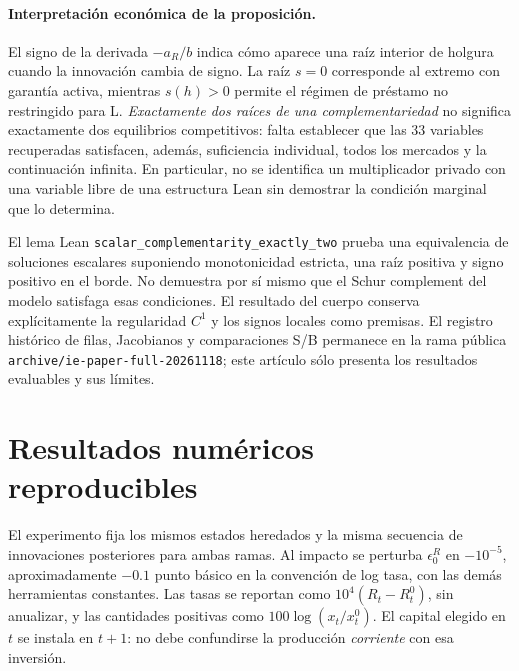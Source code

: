 
\paragraph{Interpretación económica de la proposición.}
El signo de la derivada \(-a_R/b\) indica cómo aparece una
raíz interior de holgura cuando la innovación cambia de signo.
La raíz \(s=0\) corresponde al extremo con garantía activa,
mientras \(s(h)>0\) permite el régimen de préstamo no restringido
para L. \emph{Exactamente dos raíces de una complementariedad}
no significa exactamente dos equilibrios competitivos: falta
establecer que las 33 variables recuperadas satisfacen, además,
suficiencia individual, todos los mercados y la continuación infinita.
En particular, no se identifica un multiplicador privado con una
variable libre de una estructura Lean sin demostrar la condición
marginal que lo determina.

El lema Lean \texttt{scalar\_complementarity\_exactly\_two} prueba
una equivalencia de soluciones escalares suponiendo monotonicidad
estricta, una raíz positiva y signo positivo en el borde.
No demuestra por sí mismo que el Schur complement del modelo
satisfaga esas condiciones. El resultado del cuerpo conserva
explícitamente la regularidad \(C^1\) y los signos locales como
premisas. El registro histórico de filas, Jacobianos y comparaciones S/B
permanece en la rama pública
\texttt{archive/ie-paper-full-20261118}; este artículo
sólo presenta los resultados evaluables y sus límites.

\section{Resultados numéricos reproducibles}\label{sec:compact_irf}
El experimento fija los mismos estados heredados y la misma
secuencia de innovaciones posteriores para ambas ramas.
Al impacto se perturba \(\epsilon_0^R\) en
\(-10^{-5}\), aproximadamente \(-0.1\) punto básico en la
convención de log tasa, con las demás herramientas constantes.
Las tasas se reportan como \(10^4(R_t-R_t^0)\), sin anualizar,
y las cantidades positivas como \(100\log(x_t/x_t^0)\).
El capital elegido en \(t\) se instala en \(t+1\): no debe
confundirse la producción \emph{corriente} con esa inversión.

\begin{table}[htbp]\centering\small
\caption{Impacto de una innovación inicial de remuneración de reservas de
aproximadamente \(-0.1\) pb. Dos ramas del sistema reducido;
parámetros ilustrativos, no estimaciones.}
\label{tab:compact_impact}

\end{table}

